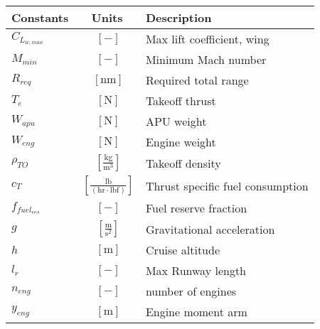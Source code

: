 % 

{\footnotesize
\begin{supertabular}{lcl}
\toprule
Constants & Units & Description \\ \midrule
$C_{L_{w,max}}$ & $~[-]$ & Max lift coefficient, wing \\
$M_{min}$ & $~[-]$ & Minimum Mach number \\
$R_{req}$ & $~\mathrm{[nm]}$ & Required total range \\
$T_e$ & $~\mathrm{[N]}$ & Takeoff thrust \\
$W_{apu}$ & $~\mathrm{[N]}$ & APU weight \\
$W_{eng}$ & $~\mathrm{[N]}$ & Engine weight \\
$\rho_{TO}$ & $~\mathrm{[\tfrac{kg}{m^3}]}$ & Takeoff density \\
$c_T$ & $~\mathrm{[\tfrac{lb}{\left(hr\cdot lbf\right)}]}$ & Thrust specific fuel consumption \\
$f_{fuel_{res}}$ & $~[-]$ & Fuel reserve fraction\\
$g$ & $~\mathrm{[\tfrac{m}{s^{2}}]}$ & Gravitational acceleration \\
$h$ & $~\mathrm{[m]}$ & Cruise altitude \\
$l_r$ & $~[-]$ & Max Runway length\\
$n_{eng}$ & $~[-]$ & number of engines \\
$y_{eng}$ & $~\mathrm{[m]}$ & Engine moment arm \\
\bottomrule
\end{supertabular}}

% 
